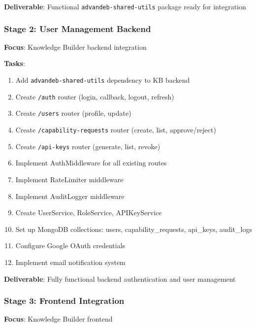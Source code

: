 \documentclass[12pt,a4paper]{article}
\begin{document}
\textbf{Deliverable}: Functional \texttt{advandeb-shared-utils} package ready for integration

\subsubsection{Stage 2: User Management Backend}
\textbf{Focus}: Knowledge Builder backend integration

\textbf{Tasks}:
\begin{enumerate}
    \item Add \texttt{advandeb-shared-utils} dependency to KB backend
    \item Create \texttt{/auth} router (login, callback, logout, refresh)
    \item Create \texttt{/users} router (profile, update)
    \item Create \texttt{/capability-requests} router (create, list, approve/reject)
    \item Create \texttt{/api-keys} router (generate, list, revoke)
    \item Implement AuthMiddleware for all existing routes
    \item Implement RateLimiter middleware
    \item Implement AuditLogger middleware
    \item Create UserService, RoleService, APIKeyService
    \item Set up MongoDB collections: users, capability\_requests, api\_keys, audit\_logs
    \item Configure Google OAuth credentials
    \item Implement email notification system
\end{enumerate}

\textbf{Deliverable}: Fully functional backend authentication and user management

\subsubsection{Stage 3: Frontend Integration}
\textbf{Focus}: Knowledge Builder frontend
\end{document}
